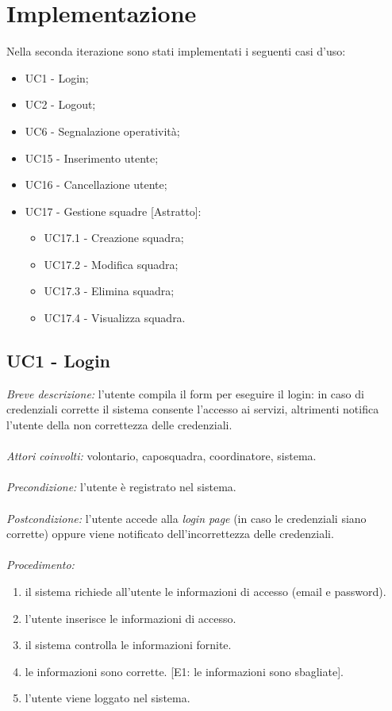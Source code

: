\section{Implementazione}
Nella seconda iterazione sono stati implementati i seguenti casi d'uso:
\begin{itemize}
	\item UC1 - Login;
	\item UC2 - Logout;
	\item UC6 - Segnalazione operatività;
	\item UC15 - Inserimento utente;
	\item UC16 - Cancellazione utente;
	\item UC17 - Gestione squadre [Astratto]:
	\begin{itemize}
		\item UC17.1 - Creazione squadra;
		\item UC17.2 - Modifica squadra;
		\item UC17.3 - Elimina squadra;
		\item UC17.4 - Visualizza squadra.
	\end{itemize}
\end{itemize}

\subsection{UC1 - Login}
\textit{Breve descrizione:} l'utente compila il form per eseguire il login: in caso di credenziali corrette il sistema consente l'accesso ai servizi, altrimenti notifica l'utente della non correttezza delle credenziali. 
\\
\\
\textit{Attori coinvolti:} volontario, caposquadra, coordinatore, sistema.
\\
\\
\textit{Precondizione:} l'utente è registrato nel sistema.
\\
\\
\textit{Postcondizione:} l'utente accede alla \textit{login page} (in caso le credenziali siano corrette) oppure viene notificato dell'incorrettezza delle credenziali.
\\
\\
\textit{Procedimento:}
\begin{enumerate}
	\item il sistema richiede all'utente le informazioni di accesso (email e password).
	\item l'utente inserisce le informazioni di accesso.
	\item il sistema controlla le informazioni fornite.
	\item le informazioni sono corrette. [E1: le informazioni sono sbagliate].
	\item l'utente viene loggato nel sistema.
\end{enumerate}


